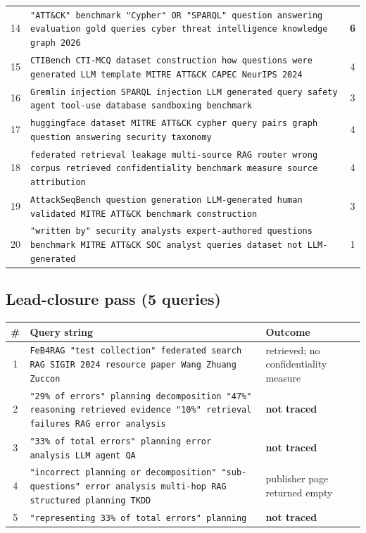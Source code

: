 \documentclass[11pt,a4paper]{article}
\begin{document}
\begin{center}
\begin{longtable}{@{}c>{\RaggedRight}p{13.6cm}c@{}}
14 & \texttt{"ATT\&CK" benchmark "Cypher" OR "SPARQL" question answering evaluation gold queries cyber threat intelligence knowledge graph 2026} & \textbf{6} \\
15 & \texttt{CTIBench CTI-MCQ dataset construction how questions were generated LLM template MITRE ATT\&CK CAPEC NeurIPS 2024} & 4 \\
16 & \texttt{Gremlin injection SPARQL injection LLM generated query safety agent tool-use database sandboxing benchmark} & 3 \\
17 & \texttt{huggingface dataset MITRE ATT\&CK cypher query pairs graph question answering security taxonomy} & 4 \\
18 & \texttt{federated retrieval leakage multi-source RAG router wrong corpus retrieved confidentiality benchmark measure source attribution} & 4 \\
19 & \texttt{AttackSeqBench question generation LLM-generated human validated MITRE ATT\&CK benchmark construction} & 3 \\
20 & \texttt{"written by" security analysts expert-authored questions benchmark MITRE ATT\&CK SOC analyst queries dataset not LLM-generated} & 1 \\
\bottomrule
\end{longtable}
\end{center}

\subsection{Lead-closure pass (5 queries)}

\begin{center}
\footnotesize
\begin{tabularx}{\textwidth}{@{}c>{\RaggedRight}X>{\RaggedRight}p{3.6cm}@{}}
\toprule
\textbf{\#} & \textbf{Query string} & \textbf{Outcome} \\
\midrule
1 & \texttt{FeB4RAG "test collection" federated search RAG SIGIR 2024 resource paper Wang Zhuang Zuccon} & retrieved; no confidentiality measure \\
2 & \texttt{"29\% of errors" planning decomposition "47\%" reasoning retrieved evidence "10\%" retrieval failures RAG error analysis} & \textbf{not traced} \\
3 & \texttt{"33\% of total errors" planning error analysis LLM agent QA} & \textbf{not traced} \\
4 & \texttt{"incorrect planning or decomposition" "sub-questions" error analysis multi-hop RAG structured planning TKDD} & publisher page returned empty \\
5 & \texttt{"representing 33\% of total errors" planning} & \textbf{not traced} \\
\bottomrule
\end{tabularx}
\end{center}
\end{document}

